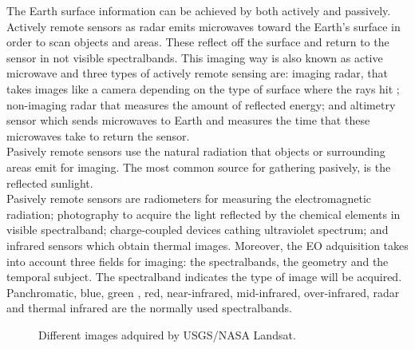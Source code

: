 The Earth surface information can be achieved by both actively  and
passively. Actively remote sensors as radar emits microwaves toward the Earth's
surface in order to scan objects and areas. These reflect off the surface and return to the sensor in not visible spectralbands. This imaging
way is also known as active microwave and three types of actively remote sensing
are: imaging radar, that takes images like a camera depending on the type of
surface where the rays hit ; non-imaging radar that measures the amount of reflected energy; and altimetry
sensor which sends microwaves to Earth and measures the time that these
microwaves take to return the sensor.\\
Pasively remote sensors use the natural radiation that objects or surrounding areas emit for
imaging. The most common source for gathering pasively, is the reflected
sunlight. \\
Pasively remote sensors are radiometers for measuring the
electromagnetic radiation; photography to acquire the light reflected by the
chemical elements in visible spectralband; charge-coupled devices cathing
ultraviolet spectrum; and infrared sensors which obtain thermal images.
Moreover, the \ac{EO} adquisition takes into account three fields for imaging:
the spectralbands, the geometry and the temporal subject. The spectralband
indicates the type of image will be acquired. Panchromatic, blue, green , red,
near-infrared, mid-infrared, over-infrared, radar and thermal infrared are the normally
used spectralbands. 

\begin{figure*}
\begin{center}
 \hspace{0.05\textwidth}
\caption{Different images adquired by \acs{USGS}/\acs{NASA} Landsat.}
\end{center}
\end{figure*}


